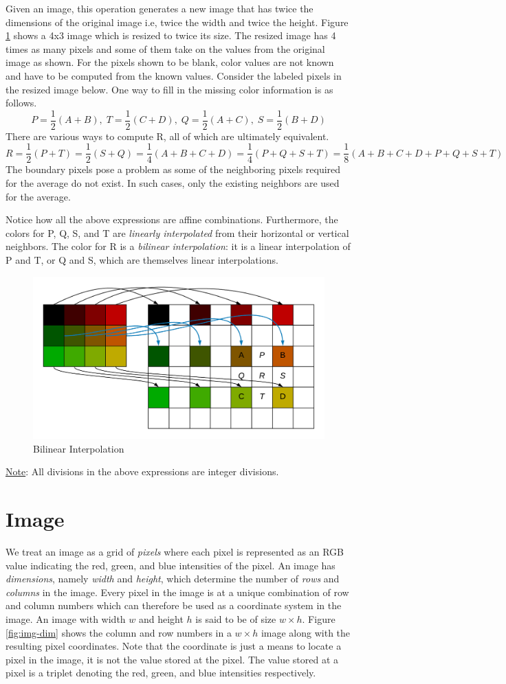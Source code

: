 \documentclass[addpoints]{exam}
\begin{document}
Given an image, this operation generates a new image that has twice the dimensions of the original image i.e, twice the width and twice the height.
Figure \ref{fig:resize} shows a 4x3 image which is resized to twice its size. The resized image has 4 times as many pixels and some of them take on the values from the original image as shown. For the pixels shown to be blank, color values are not known and have to be computed from the known values.
Consider the labeled pixels in the resized image below. One way to fill in the missing color information is as follows.
\[
  P = \frac{1}{2}(A + B),\; T = \frac{1}{2}(C + D),\; Q = \frac{1}{2}(A + C),\; S = \frac{1}{2}(B + D)
\]
There are various ways to compute R, all of which are ultimately equivalent.
\[
  R = \frac{1}{2}(P + T) = \frac{1}{2}(S + Q) =  \frac{1}{4}(A + B + C + D) = \frac{1}{4}(P + Q + S + T) = \frac{1}{8}(A + B + C + D + P + Q + S + T)
\]
The boundary pixels pose a problem as some of the neighboring pixels required for the average do not exist. In such cases, only the existing neighbors are used for the average.

Notice how all the above expressions are affine combinations. Furthermore, the colors for P, Q, S, and T are \textit{linearly interpolated} from their horizontal or vertical neighbors. The color for R is a \textit{bilinear interpolation}: it is a linear interpolation of P and T, or Q and S, which are themselves linear interpolations.

\begin{figure}
  \centering
  \includegraphics[width=.4\textwidth, align=t]{resize}
  \caption{Bilinear Interpolation}
  \label{fig:resize}
\end{figure}
\underline{Note}: All divisions in the above expressions are integer divisions.

\section{Image}

We treat an image as a grid of \textit{pixels} where each pixel is represented as an RGB value indicating the red, green, and blue intensities of the pixel. An image has \textit{dimensions}, namely \textit{width} and \textit{height}, which determine the number of \textit{rows} and \textit{columns} in the image. Every pixel in the image is at a unique combination of row and column numbers which can therefore be used as a coordinate system in the image. An image with width $w$ and height $h$ is said to be of size $w\times h$. Figure \ref{fig:img-dim} shows the column and row numbers in a $w\times h$ image along with the resulting pixel coordinates. Note that the coordinate is just a means to locate a pixel in the image, it is not the value stored at the pixel. The value stored at a pixel is a triplet denoting the red, green, and blue intensities respectively.
\end{document}
